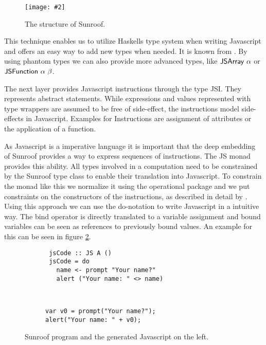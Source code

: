 \documentclass{llncs}
\newcommand{\Src}[1]{{\sf #1}}
\newcommand{\Figure}[3]{%
\begin{figure}[h]%
\vspace{-0.5cm}%
\begin{center}%
\texttt{[image: \#2]}%
\vspace{-0.5cm}%
\end{center}%
\caption{#3}%
\label{#1}%
\vspace{-0.5cm}%
\end{figure}%
}
\begin{document}
\Figure{fig:structure}{../figures/sunroof-structure.pdf}{The structure of Sunroof.}

This technique enables us to utilize 
Haskells type system when writing Javascript
and offers an easy way to add new types when needed.
It is known from 
\citet{Svenningsson:12:CombiningEmbedding}.
By using phantom types we can also provide more advanced types,
like $\Src{JSArray\ \alpha}$ or $\Src{JSFunction\ \alpha\ \beta}$.

The next layer provides Javascript instructions through the type \Src{JSI}.
They represents abstract statements. While expressions and values
represented with type wrappers are assumed to be free of side-effect,
the instructions model side-effects in Javascript. Examples for Instructions
are assignment of attributes or the application of a function.

As Javascript is a imperative language it is important that the deep embedding
of Sunroof provides a way to express sequences of instructions. 
The \Src{JS} monad provides this ability.
All types involved in a computation need to be constrained by the 
\Src{Sunroof} type class to enable their translation into Javascript.
To constrain the monad like this we normalize it using the operational package
\citep{Hackage:10:Operational,Apfelmus:10:Operational} and
we put constraints on the constructors of the instructions,
as described in detail by \citep{Sculthorpe:13:ConstrainedMonads}.
Using this approach we can use the do-notation to write Javascript 
in a intuitive way. The bind operator is directly translated to a variable
assignment and bound variables can be seen as references to previously 
bound values. An example for this can be seen in figure \ref{fig:code-example}.

\begin{figure}
\vspace{-0.5cm}
\centering
\begin{subfigure}{0.45\textwidth}%
\begin{verbatim}
 jsCode :: JS A ()
 jsCode = do
   name <- prompt "Your name?"
   alert ("Your name: " <> name)
\end{verbatim}%
\end{subfigure}%
\hfill%
\begin{subfigure}{0.45\textwidth}
\vspace{0.25cm}%
\begin{verbatim}
  
  
var v0 = prompt("Your name?"); 
alert("Your name: " + v0);
\end{verbatim}%
\end{subfigure}%
\vspace{-0.2cm}%
\caption{Sunroof program and the generated Javascript on the left.}%
\label{fig:code-example}%
\vspace{-0.5cm}
\end{figure}
\end{document}
